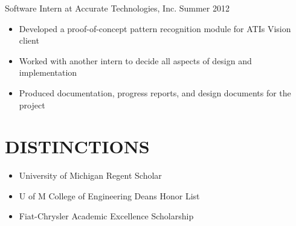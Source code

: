 \documentclass[line,margin]{res}
\begin{document}
\begin{resume}
                {\sc Software Intern at Accurate Technologies, Inc.} \hfill            Summer 2012
                 \begin{itemize}  \itemsep -2pt %
                 \item Developed a proof-of-concept pattern recognition module for ATI\textquotesingle s Vision client
                 \item Worked with another intern to decide all aspects of design and implementation
                 \item Produced documentation, progress reports, and design documents for the project
                 \end{itemize} 

\section{\textcolor{HeaderColor}{DISTINCTIONS}}
    \begin{itemize} \itemsep-0.2em
    \item University of Michigan Regent Scholar
    \item U of M College of Engineering Dean\textquotesingle s Honor List
    \item Fiat-Chrysler Academic Excellence Scholarship
    \end{itemize}
 

\end{resume}
\end{document}
